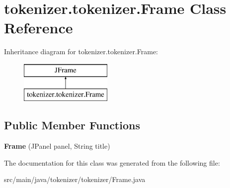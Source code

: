 \hypertarget{classtokenizer_1_1tokenizer_1_1_frame}{}\section{tokenizer.\+tokenizer.\+Frame Class Reference}
\label{classtokenizer_1_1tokenizer_1_1_frame}
Inheritance diagram for tokenizer.\+tokenizer.\+Frame\+:\begin{figure}[H]
\begin{center}
\leavevmode
\includegraphics[height=2.000000cm]{classtokenizer_1_1tokenizer_1_1_frame}
\end{center}
\end{figure}
\subsection*{Public Member Functions}
\begin{DoxyCompactItemize}
\item 
\hypertarget{classtokenizer_1_1tokenizer_1_1_frame_ae413453366a008d2250ed120391987c2}{}{\bfseries Frame} (J\+Panel panel, String title)\label{classtokenizer_1_1tokenizer_1_1_frame_ae413453366a008d2250ed120391987c2}

\end{DoxyCompactItemize}


The documentation for this class was generated from the following file\+:\begin{DoxyCompactItemize}
\item 
src/main/java/tokenizer/tokenizer/Frame.\+java\end{DoxyCompactItemize}
